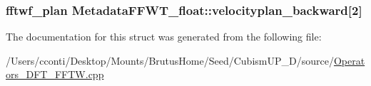 \subsubsection[{velocityplan\+\_\+backward}]{\setlength{\rightskip}{0pt plus 5cm}fftwf\+\_\+plan Metadata\+F\+F\+W\+T\+\_\+float\+::velocityplan\+\_\+backward\mbox{[}2\mbox{]}}\label{struct_metadata_f_f_w_t__float_a9e2ff4e1a4bbf29bcfd38c908b615ed5}


The documentation for this struct was generated from the following file\+:\begin{DoxyCompactItemize}
\item 
/\+Users/cconti/\+Desktop/\+Mounts/\+Brutus\+Home/\+Seed/\+Cubism\+U\+P\+\_\+D/source/\hyperlink{_operators___d_f_t___f_f_t_w_8cpp}{Operators\+\_\+\+D\+F\+T\+\_\+\+F\+F\+T\+W.\+cpp}\end{DoxyCompactItemize}
